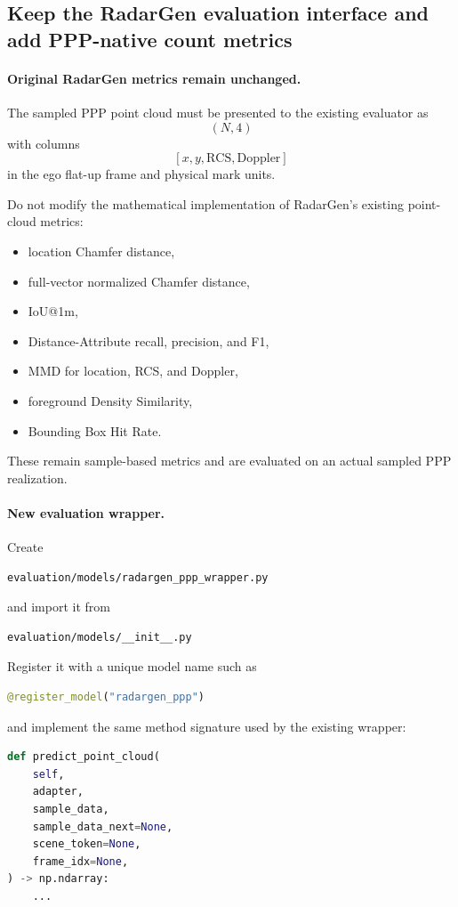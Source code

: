 \documentclass[11pt,a4paper]{article}
\begin{document}
\subsection{Keep the RadarGen evaluation interface and add PPP-native count metrics}

\paragraph{Original RadarGen metrics remain unchanged.}
The sampled PPP point cloud must be presented to the existing evaluator as
\[
    (N,4)
\]
with columns
\[
    [x,y,\mathrm{RCS},\mathrm{Doppler}]
\]
in the ego flat-up frame and physical mark units.

Do not modify the mathematical implementation of RadarGen's existing point-cloud metrics:
\begin{itemize}
    \item location Chamfer distance,
    \item full-vector normalized Chamfer distance,
    \item IoU@1m,
    \item Distance-Attribute recall, precision, and F1,
    \item MMD for location, RCS, and Doppler,
    \item foreground Density Similarity,
    \item Bounding Box Hit Rate.
\end{itemize}

These remain sample-based metrics and are evaluated on an actual sampled PPP realization.

\paragraph{New evaluation wrapper.}
Create
\begin{lstlisting}
evaluation/models/radargen_ppp_wrapper.py
\end{lstlisting}
and import it from
\begin{lstlisting}
evaluation/models/__init__.py
\end{lstlisting}

Register it with a unique model name such as
\begin{lstlisting}[language=Python]
@register_model("radargen_ppp")
\end{lstlisting}
and implement the same method signature used by the existing wrapper:
\begin{lstlisting}[language=Python]
def predict_point_cloud(
    self,
    adapter,
    sample_data,
    sample_data_next=None,
    scene_token=None,
    frame_idx=None,
) -> np.ndarray:
    ...
\end{lstlisting}
\end{document}

